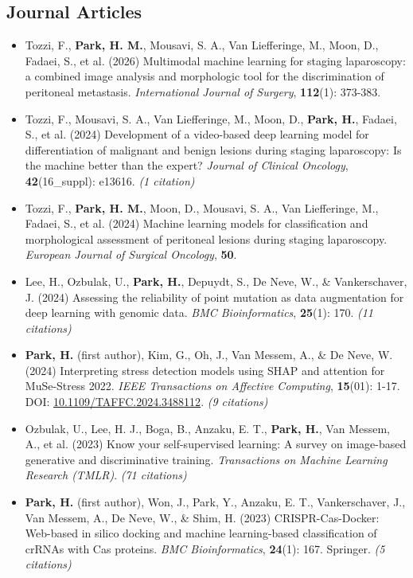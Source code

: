 \documentclass[11pt]{article}
\begin{document}
\subsection{Journal Articles}
\begin{itemize}
    \item[\checkmark] Tozzi, F., \textbf{Park, H. M.}, Mousavi, S. A., Van Liefferinge, M., Moon, D., Fadaei, S., et al. (2026) Multimodal machine learning for staging laparoscopy: a combined image analysis and morphologic tool for the discrimination of peritoneal metastasis. \textit{International Journal of Surgery}, \textbf{112}(1): 373-383.
    \item[\checkmark] Tozzi, F., Mousavi, S. A., Van Liefferinge, M., Moon, D., \textbf{Park, H.}, Fadaei, S., et al. (2024) Development of a video-based deep learning model for differentiation of malignant and benign lesions during staging laparoscopy: Is the machine better than the expert? \textit{Journal of Clinical Oncology}, \textbf{42}(16\_suppl): e13616. \textit{(1 citation)}
    \item[\checkmark] Tozzi, F., \textbf{Park, H. M.}, Moon, D., Mousavi, S. A., Van Liefferinge, M., Fadaei, S., et al. (2024) Machine learning models for classification and morphological assessment of peritoneal lesions during staging laparoscopy. \textit{European Journal of Surgical Oncology}, \textbf{50}.
    \item[\checkmark] Lee, H., Ozbulak, U., \textbf{Park, H.}, Depuydt, S., De Neve, W., \& Vankerschaver, J. (2024) Assessing the reliability of point mutation as data augmentation for deep learning with genomic data. \textit{BMC Bioinformatics}, \textbf{25}(1): 170. \textit{(11 citations)}
    \item[\checkmark] \textbf{Park, H.} (first author), Kim, G., Oh, J., Van Messem, A., \& De Neve, W. (2024) Interpreting stress detection models using SHAP and attention for MuSe-Stress 2022. \textit{IEEE Transactions on Affective Computing}, \textbf{15}(01): 1-17. DOI: \href{https://doi.org/10.1109/TAFFC.2024.3488112}{10.1109/TAFFC.2024.3488112}. \textit{(9 citations)}
    \item[\checkmark] Ozbulak, U., Lee, H. J., Boga, B., Anzaku, E. T., \textbf{Park, H.}, Van Messem, A., et al. (2023) Know your self-supervised learning: A survey on image-based generative and discriminative training. \textit{Transactions on Machine Learning Research (TMLR)}. \textit{(71 citations)}
    \item[\checkmark] \textbf{Park, H.} (first author), Won, J., Park, Y., Anzaku, E. T., Vankerschaver, J., Van Messem, A., De Neve, W., \& Shim, H. (2023) CRISPR-Cas-Docker: Web-based in silico docking and machine learning-based classification of crRNAs with Cas proteins. \textit{BMC Bioinformatics}, \textbf{24}(1): 167. Springer. \textit{(5 citations)}

\end{itemize}
\end{document}

